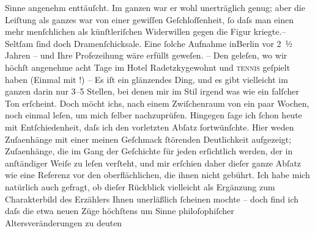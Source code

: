 \begin{ledgroupsized}[t]{13cm}
               Sinne angenehm enttäuſcht. Im ganzen war er wohl unerträglich genug; aber die
               Leiſtung als ganzes war von einer gewiſſen Geſchloſſenheit, ſo daſs man einen mehr
               menſchlichen als künſtleriſchen Widerwillen gegen die Figur kriegte.– Seltſam ſind
               doch Dramenſchicksale. Eine ſolche Aufnahme inBerlin vor 2 ½ Jahren – und Ihre Profezeihung wäre erfüllt geweſen. – Den
                  \label{K_L03005-2v}\label{K_L03005-2h} geleſen, wo wir höchſt angenehme acht Tage im Hotel Radetzkygewohnt und \textsc{tennis}
               geſpielt haben (Einmal mit \label{K_L03005-3v}\label{K_L03005-3h}!) – Es iſt ein glänzendes Ding, und es gibt vielleicht im ganzen darin nur
               3–5 Stellen, bei denen mir im Stil irgend was wie ein falſcher Ton erſcheint. Doch
               möcht ichs, nach einem Zwiſchenraum von ein paar Wochen, noch einmal leſen, um mich
               ſelber nachzuprüfen. Hingegen ſage ich ſchon heute mit Entſchiedenheit, daſs ich den
               vorletzten Abſatz fortwünſchte. Hier weden Zuſa{\geminationm}enhänge
               mit einer meinen Geſchmack ſtörenden Deutlichkeit aufgezeigt; Zuſa{\geminationm}enhänge, die im
                  {\pb}Gang der Geſchichte  für jeden erſichtlich werden, der in
               anſtändiger Weiſe zu leſen verſteht, und mir erſchien daher dieſer ganze Abſatz wie
               eine Referenz vor den oberflächlichen, die ihnen nicht gebührt. Ich habe mich
               natürlich auch gefragt, ob dieſer Rückblick vielleicht als Ergänzung zum
               Charakterbild des Erzählers Ihnen unerläßlich ſcheinen mochte – doch find ich daſs
               die etwa neuen Züge höchſtens um Sinne philoſophiſcher Altersveränderungen zu deuten

\end{ledgroupsized}
